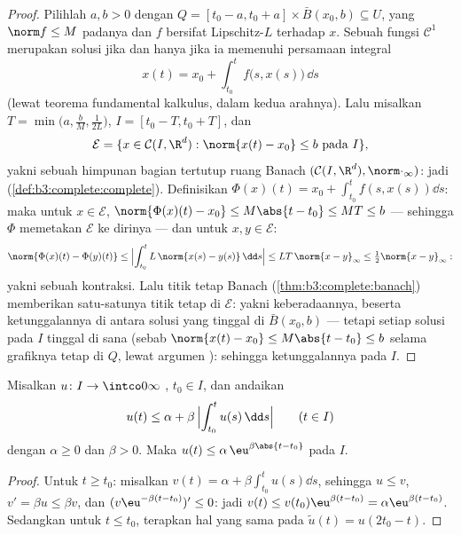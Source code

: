 \begin{proof}
Pilihlah $a, b > 0$ dengan $Q = [t_0 - a, t_0 + a]\times\bar
B(x_0, b) \subseteq U$, yang $\norm f \leq M$ padanya dan $f$ bersifat
Lipschitz-$L$ terhadap $x$. Sebuah fungsi $\mathcal C^1$ merupakan solusi
jika dan hanya jika ia memenuhi persamaan integral
\[
x(t) = x_0 + \int_{t_0}^{t}f\bigl(s, x(s)\bigr)\,\dd s
\]
(lewat teorema fundamental kalkulus, dalam kedua arahnya). Lalu misalkan $T =
\min\bigl(a, \frac bM, \frac1{2L}\bigr)$, $I = [t_0 - T, t_0
+ T]$, dan
\[
\mathcal E = \{x \in \mathcal C(I, \R^d) : \norm{x(t) - x_0}
\leq b\ \text{pada } I\},
\]
yakni sebuah himpunan bagian tertutup ruang Banach $(\mathcal C(I, \R^d),
\norm\cdot_\infty)$: jadi 
(\cref{def:b3:complete:complete}). Definisikan $\Phi(x)(t) = x_0 +
\int_{t_0}^tf(s, x(s))\dd s$: maka untuk $x \in \mathcal E$,
$\norm{\Phi(x)(t) - x_0} \leq M\abs{t - t_0} \leq MT \leq b$
--- sehingga $\Phi$ memetakan $\mathcal E$ ke dirinya --- dan untuk $x, y \in
\mathcal E$:
\[
\norm{\Phi(x)(t) - \Phi(y)(t)} \leq \Bigl|\int_{t_0}^t
L\,\norm{x(s) - y(s)}\,\dd s\Bigr| \leq LT\,\norm{x -
y}_\infty \leq \tfrac12\norm{x - y}_\infty :
\]
yakni sebuah kontraksi. Lalu titik tetap Banach
(\cref{thm:b3:complete:banach}) memberikan satu-satunya titik tetap di
$\mathcal E$: yakni keberadaannya, beserta ketunggalannya di antara solusi
yang tinggal di $\bar B(x_0, b)$ --- tetapi setiap solusi pada $I$ tinggal
di sana (sebab $\norm{x(t) - x_0} \leq M\abs{t - t_0} \leq b$ selama
grafiknya tetap di $Q$, lewat argumen ):
sehingga ketunggalannya pada $I$.
\end{proof}

\begin{lemma}[Grönwall]\label{lem:b3:ode:gronwall}
Misalkan $u \colon I \to \intco0\infty$ , $t_0 \in
I$, dan andaikan
\[
u(t) \leq \alpha + \beta\,\Bigl|\int_{t_0}^{t}u(s)\,\dd
s\Bigr| \qquad (t \in I)
\]
dengan $\alpha \geq 0$ dan $\beta > 0$. Maka $u(t) \leq
\alpha\,\eu^{\beta\abs{t - t_0}}$ pada $I$.
\end{lemma}

\begin{proof}
Untuk $t \geq t_0$: misalkan $v(t) = \alpha +
\beta\int_{t_0}^tu(s)\dd s$, sehingga $u \leq v$, $v' = \beta u
\leq \beta v$, dan $(v\eu^{-\beta(t - t_0)})' \leq 0$: jadi $v(t)
\leq v(t_0)\eu^{\beta(t-t_0)} = \alpha\eu^{\beta(t - t_0)}$.
Sedangkan untuk $t \leq t_0$, terapkan hal yang sama pada $\tilde u(t) = u(2t_0 -
t)$.
\end{proof}

